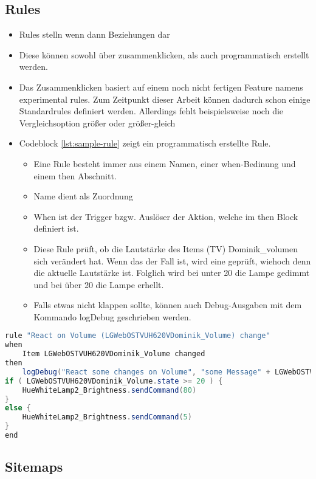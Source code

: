 \subsection{Rules}
\begin{itemize}
	\item Rules stelln wenn dann Beziehungen dar
	\item Diese können sowohl über zusammenklicken, als auch programmatisch erstellt werden. 
	\item Das Zusammenklicken basiert auf einem noch nicht fertigen Feature namens experimental rules. Zum Zeitpunkt dieser Arbeit können dadurch schon einige Standardrules definiert werden. Allerdings fehlt beispielsweise noch die Vergleichsoption größer oder größer-gleich
	\item Codeblock \ref{lst:sample-rule} zeigt ein programmatisch erstellte Rule.
	\begin{itemize}
		\item Eine Rule besteht immer aus einem Namen, einer when-Bedinung und einem then Abschnitt.
		\item Name dient als Zuordnung
		\item When ist der Trigger bzgw. Auslöser der Aktion, welche im then Block definiert ist.
		\item Diese Rule prüft, ob die Lautstärke des Items (TV) Dominik\_volumen sich verändert hat.
		Wenn das der Fall ist, wird eine geprüft, wiehoch denn die aktuelle Lautstärke ist.
		Folglich wird bei unter 20 die Lampe gedimmt und bei über 20 die Lampe erhellt.
		\item Falls etwas nicht klappen sollte, können auch Debug-Ausgaben mit dem Kommando logDebug geschrieben werden.
	\end{itemize}
\end{itemize}
\begin{lstlisting}[language=java,firstnumber=1,caption=Beispiele Rule Beispiel,label=lst:sample-rule]
rule "React on Volume (LGWebOSTVUH620VDominik_Volume) change"
when
	Item LGWebOSTVUH620VDominik_Volume changed
then
	logDebug("React some changes on Volume", "some Message" + LGWebOSTVUH620VDominik_Volume.state.toString)
if ( LGWebOSTVUH620VDominik_Volume.state >= 20 ) {
	HueWhiteLamp2_Brightness.sendCommand(80)
}
else {
	HueWhiteLamp2_Brightness.sendCommand(5)
}
end
\end{lstlisting}

\subsection{Sitemaps}

